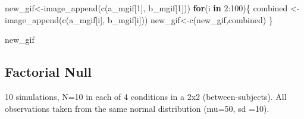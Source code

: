 \documentclass[
  letterpaper,
  DIV=11,
  numbers=noendperiod]{scrreprt}
\newenvironment{Shaded}{\begin{snugshade}}{\end{snugshade}}
\newcommand{\ControlFlowTok}[1]{\textcolor[rgb]{0.00,0.23,0.31}{\textbf{#1}}}
\newcommand{\DecValTok}[1]{\textcolor[rgb]{0.68,0.00,0.00}{#1}}
\newcommand{\FunctionTok}[1]{\textcolor[rgb]{0.28,0.35,0.67}{#1}}
\newcommand{\NormalTok}[1]{\textcolor[rgb]{0.00,0.23,0.31}{#1}}
\newcommand{\OtherTok}[1]{\textcolor[rgb]{0.00,0.23,0.31}{#1}}
\newcommand{\SpecialCharTok}[1]{\textcolor[rgb]{0.37,0.37,0.37}{#1}}
\begin{document}
\begin{Shaded}
\begin{Highlighting}[]
\NormalTok{new\_gif}\OtherTok{\textless{}{-}}\FunctionTok{image\_append}\NormalTok{(}\FunctionTok{c}\NormalTok{(a\_mgif[}\DecValTok{1}\NormalTok{], b\_mgif[}\DecValTok{1}\NormalTok{]))}
\ControlFlowTok{for}\NormalTok{(i }\ControlFlowTok{in} \DecValTok{2}\SpecialCharTok{:}\DecValTok{100}\NormalTok{)\{}
\NormalTok{  combined }\OtherTok{\textless{}{-}} \FunctionTok{image\_append}\NormalTok{(}\FunctionTok{c}\NormalTok{(a\_mgif[i], b\_mgif[i]))}
\NormalTok{  new\_gif}\OtherTok{\textless{}{-}}\FunctionTok{c}\NormalTok{(new\_gif,combined)}
\NormalTok{\}}

\NormalTok{new\_gif}
\end{Highlighting}
\end{Shaded}

\subsection{Factorial Null}\label{factorial-null}

10 simulations, N=10 in each of 4 conditions in a 2x2
(between-subjects). All observations taken from the same normal
distribution (mu=50, sd =10).
\end{document}
